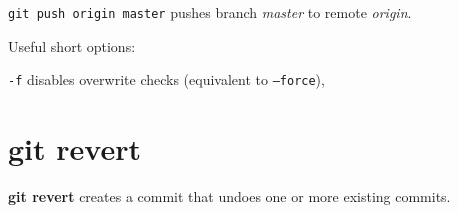 \documentclass{charun}
\begin{document}
\begin{multicols*}{2}
\texttt{git push origin master} pushes branch \emph{master} to remote \emph{origin}.

Useful short options:
\begin{compactenum}
\item [\texttt{-f}] disables overwrite checks (equivalent to \texttt{--force}),
\end{compactenum}

\section{git revert}
\textbf{git revert} creates a commit that undoes one or more existing commits.

\end{multicols*}
\end{document}
